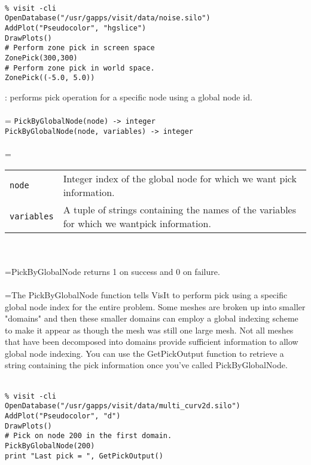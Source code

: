 \documentclass[10pt,a4paper]{report}
\begin{document}
\\[-6mm]
\begin{verbatim}% visit -cli
OpenDatabase("/usr/gapps/visit/data/noise.silo")
AddPlot("Pseudocolor", "hgslice")
DrawPlots()
# Perform zone pick in screen space
ZonePick(300,300)
# Perform zone pick in world space.
ZonePick((-5.0, 5.0))
\end{verbatim}
\newpage


{}
: performs pick operation for a specific node using a global node id.\\[-3mm]

 \\ 
\hangindent=\parindent 
\verb!PickByGlobalNode(node) -> integer!\\ 
\verb!PickByGlobalNode(node, variables) -> integer!\\ [-3mm]

 \\ 
\hangindent=\parindent 
\begin{tabular}{lp{9cm}}
\verb!node! & Integer index of the global node for which we want pick information. \\
\verb!variables! & A tuple of strings containing the names of the variables for which we wantpick information. \\
\end{tabular} \\[-2mm]


 \\ 
\hangindent=\parindent PickByGlobalNode returns 1 on success and 0 on failure. \\[-3mm] 

 \\ 
\hangindent=\parindent The PickByGlobalNode function tells VisIt to perform pick using a specific global node index for the entire problem. Some meshes are broken up into smaller "domains" and then these smaller domains can employ a global indexing scheme to make it appear as though the mesh was still one large mesh. Not all meshes that have been decomposed into domains provide sufficient information to allow global node indexing. You can use the GetPickOutput function to retrieve a string containing the pick information once you've called PickByGlobalNode. \\[-3mm] 

\\[-6mm]
\begin{verbatim}% visit -cli
OpenDatabase("/usr/gapps/visit/data/multi_curv2d.silo")
AddPlot("Pseudocolor", "d")
DrawPlots()
# Pick on node 200 in the first domain.
PickByGlobalNode(200)
print "Last pick = ", GetPickOutput()
\end{verbatim}
\newpage
\end{document}
